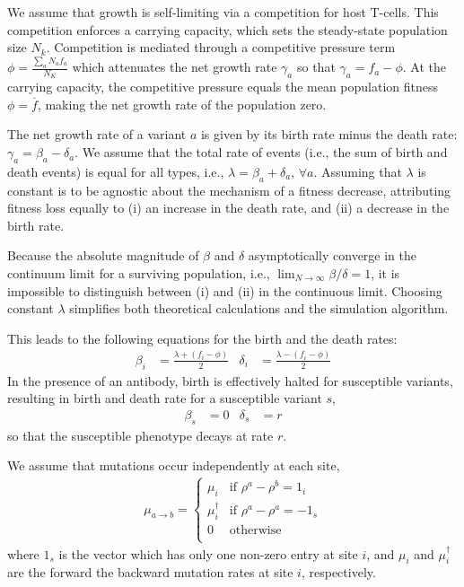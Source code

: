 \documentclass[11pt]{article}
\begin{document}
We assume that growth is self-limiting via a competition for host T-cells. This competition enforces a carrying capacity, which sets the steady-state population size $N_k$. Competition is mediated through a competitive pressure term $\phi =  \frac{\sum_a N_a f_a}{N_K}$ which attenuates the net growth rate $\gamma_a$ so that $\gamma_a = f_a - \phi$. At the carrying capacity, the competitive pressure equals the mean population fitness $\phi=\overline{f}$,
	making the net growth rate of the population zero.

The net growth rate of a variant $a$ is given  by its birth rate minus the death rate: $\gamma_a = \beta_a - \delta_a$.
We  assume that the total rate of events (i.e., the sum of birth and death events) is equal for all types, i.e.,  
	$\lambda = \beta_a + \delta_a, \,\forall a$.
Assuming that $\lambda$ is constant is to be agnostic about the mechanism of a fitness decrease, 
	attributing fitness loss equally to (i) an increase in  the death rate, and (ii) a decrease in the birth rate.

Because the absolute magnitude of $\beta$ and $\delta$ asymptotically converge in the continuum limit for a surviving population, i.e., $\lim_{N \rightarrow \infty}  \beta / \delta = 1$, it is impossible to distinguish between (i) and (ii) in the continuous limit.
Choosing constant $\lambda$ simplifies both theoretical calculations and the simulation algorithm.

This leads to the following equations for the birth and  the death rates:
\begin{align}
 \beta_i &= \frac{\lambda + (f_i - \phi)}{2} &  \delta_i &= \frac{\lambda - (f_i - \phi)}{2} \label{eq.rates}
 \end{align}
In the presence of an antibody, birth is effectively halted for susceptible variants, resulting in birth and death rate for a susceptible variant $s$,
\begin{align}
 \beta_s &= 0 &  \delta_s &= r
 \end{align}
so that  the susceptible phenotype decays at rate $r$.

	
We assume that mutations occur independently at each site,
\begin{align}
\mu_{a\to b} = 
	\begin{cases}
		\mu_{i}   &\text{if  } \rho^{a}-\rho^{b} = 1_{i}\\
		\mu^{\dagger}_{i}    &\text{if  } \rho^{a}-\rho^{a} = -1_{s}\\
		0     &\text{otherwise}\\
	\end{cases}
\end{align}
where $1_s$ is the vector which has only one non-zero entry at site $i$, and  $\mu_i$  and $\mu_i^\dagger$ are the forward the backward mutation rates at site $i$, respectively.
\end{document}
